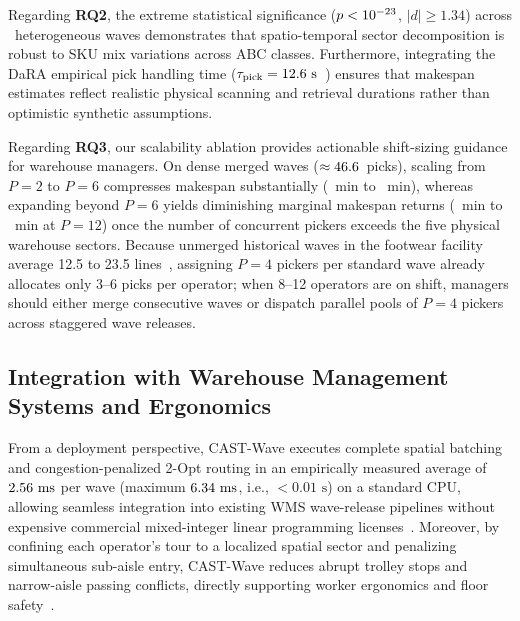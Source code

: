 \documentclass[conference]{IEEEtran}
\begin{document}
Regarding \textbf{RQ2}, the extreme statistical significance ($p < 10^{-23}$, $|d| \ge 1.34$) across \BenchmarkWaves~heterogeneous waves demonstrates that spatio-temporal sector decomposition is robust to SKU mix variations across ABC classes. Furthermore, integrating the DaRA empirical pick handling time ($\tau_{\text{pick}} = 12.6\text{ s}$~\cite{niemann2026dara}) ensures that makespan estimates reflect realistic physical scanning and retrieval durations rather than optimistic synthetic assumptions.

Regarding \textbf{RQ3}, our scalability ablation provides actionable shift-sizing guidance for warehouse managers. On dense merged waves ($\approx 46.6$~picks), scaling from $P = 2$ to $P = 6$ compresses makespan substantially (\DenseMkCASTTwo~min to \DenseMkCASTSix~min), whereas expanding beyond $P = 6$ yields diminishing marginal makespan returns (\DenseMkCASTSix~min to \DenseMkCASTTwelve~min at $P = 12$) once the number of concurrent pickers exceeds the five physical warehouse sectors. Because unmerged historical waves in the footwear facility average 12.5 to 23.5 lines~\cite{assis2025order}, assigning $P = 4$ pickers per standard wave already allocates only 3--6 picks per operator; when 8--12 operators are on shift, managers should either merge consecutive waves or dispatch parallel pools of $P = 4$ pickers across staggered wave releases.

\subsection{Integration with Warehouse Management Systems and Ergonomics}
\label{sec:wms_integration}
From a deployment perspective, CAST-Wave executes complete spatial batching and congestion-penalized 2-Opt routing in an empirically measured average of $2.56\text{ ms}$ per wave (maximum $6.34\text{ ms}$, i.e., $< 0.01\text{ s}$) on a standard CPU, allowing seamless integration into existing WMS wave-release pipelines without expensive commercial mixed-integer linear programming licenses~\cite{briant2025solving,maheshwari2023digital}. Moreover, by confining each operator's tour to a localized spatial sector and penalizing simultaneous sub-aisle entry, CAST-Wave reduces abrupt trolley stops and narrow-aisle passing conflicts, directly supporting worker ergonomics and floor safety~\cite{gabellini2024hybrid,koreis2026side}.
\end{document}
